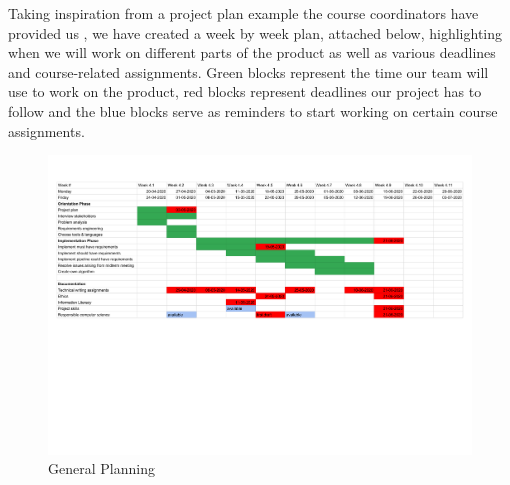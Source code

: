 \documentclass{report}
\begin{document}
Taking inspiration from a project plan example the course coordinators have provided us \cite{examplereport}, we have created a week by week plan, attached below, highlighting when we will work on different parts of the product as well as various deadlines and course-related assignments. Green blocks represent the time our team will use to work on the product, red blocks represent deadlines our project has to follow and the blue blocks serve as reminders to start working on certain course assignments.

\begin{figure}
    \centering
    \includegraphics[width=17cm, left]{scheduling - Sheet1.pdf}
    \caption{General Planning}
    \label{planning}
\end{figure}


\medskip
\printbibliography
\end{document}
